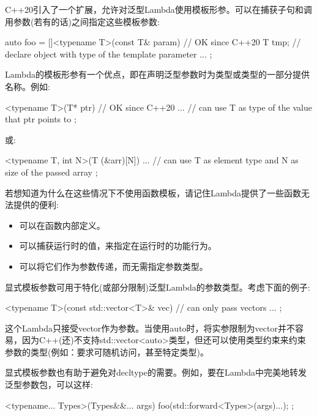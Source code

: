 

C++20引入了一个扩展，允许对泛型Lambda使用模板形参。可以在捕获子句和调用参数(若有的话)之间指定这些模板参数:

\begin{cpp}
auto foo = []<typename T>(const T& param) { // OK since C++20
				T tmp{}; // declare object with type of the template parameter
				...
			};
\end{cpp}

Lambda的模板形参有一个优点，即在声明泛型参数时为类型或类型的一部分提供名称。例如:

\begin{cpp}
[]<typename T>(T* ptr) { // OK since C++20
	... // can use T as type of the value that ptr points to
};
\end{cpp}

或:

\begin{cpp}
[]<typename T, int N>(T (&arr)[N]) {
	... // can use T as element type and N as size of the passed array
};
\end{cpp}

若想知道为什么在这些情况下不使用函数模板，请记住Lambda提供了一些函数无法提供的便利:

\begin{itemize}
\item 
可以在函数内部定义。

\item 
可以捕获运行时的值，来指定在运行时的功能行为。

\item 
可以将它们作为参数传递，而无需指定参数类型。
\end{itemize}



显式模板参数可用于特化(或部分限制)泛型Lambda的参数类型。考虑下面的例子:

\begin{cpp}
[]<typename T>(const std::vector<T>& vec) { // can only pass vectors
	...
};
\end{cpp}

这个Lambda只接受vector作为参数。当使用auto时，将实参限制为vector并不容易，因为C++(还)不支持std::vector<auto>类型，但还可以使用类型约束来约束参数的类型(例如：要求可随机访问，甚至特定类型)。

显式模板参数也有助于避免对decltype的需要。例如，要在Lambda中完美地转发泛型参数包，可以这样:

\begin{cpp}
[]<typename... Types>(Types&&... args) {
	foo(std::forward<Types>(args)...);
};
\end{cpp}

